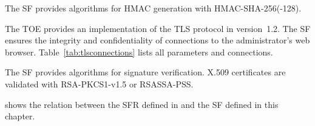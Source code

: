 
The SF provides algorithms for HMAC generation with HMAC-SHA-256(-128).



The TOE provides an implementation of the TLS protocol in version~1.2. The SF
ensures the integrity and confidentiality of connections to the administrator's
web browser. Table~\vref{tab:tlsconnections} lists all parameters and connections.


The SF  provides algorithms for signature
verification. X.509 certificates are validated with RSA-PKCS1-v1.5 or
RSASSA-PSS.



\pagebreak


 shows the relation between the SFR defined in
 and the SF defined in this chapter.





